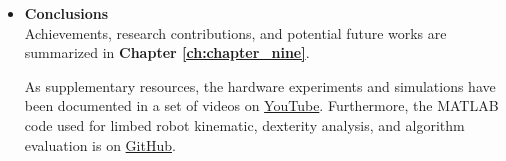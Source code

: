 \begin{itemize}
    \item \textbf{Conclusions}\\
    Achievements, research contributions, and potential future works are summarized in \textbf{Chapter \ref{ch:chapter_nine}}.
    
    \vspace{1.0cm}
    
    \begin{tcolorbox}[
      colback=bluepoli!20,
      colframe=bluepoli!40, 
      title=Additional Resources,
      sharp corners=south,
      fonttitle=\bfseries,
      coltitle=bluepoli!90!black,
    ]
    As supplementary resources, the hardware experiments and simulations have been documented in a set of videos on \href{https://youtube.com/playlist?list=PLFgoOtxCJKTPv_dibdvSUT_YPGDJBc_5C&si=bgCxZ_qWpax2N8Xt}{YouTube}.
    Furthermore, the MATLAB code used for limbed robot kinematic, dexterity analysis, and algorithm evaluation is on \href{https://github.com/AlePuglisi/limbed-robot-control}{GitHub}.
    \end{tcolorbox}
\end{itemize}





